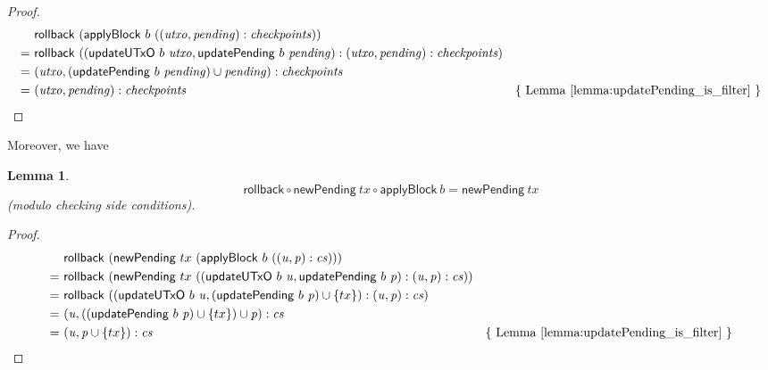 \documentclass{article}
\newtheorem{lemma}{Lemma}
\begin{document}
\begin{proof}
\begin{align*}
    & \mathsf{rollback} ~ (\mathsf{applyBlock} ~ b ~ ((\mathit{utxo}, \mathit{pending}) : \mathit{checkpoints})) \\
= ~ & \mathsf{rollback} ~ (( \mathsf{updateUTxO} ~ b ~ \mathit{utxo}
         , \mathsf{updatePending} ~ b ~ \mathit{pending}
         )
         : (\mathit{utxo}, \mathit{pending}) : \mathit{checkpoints}
         ) \\
= ~ & (\mathit{utxo}, (\mathsf{updatePending} ~ b ~ \mathit{pending}) \cup \mathit{pending}) : \mathit{checkpoints} \\
= ~ & (\mathit{utxo}, \mathit{pending}) : \mathit{checkpoints} & \text{\{ Lemma~\ref{lemma:updatePending_is_filter} \}}
\end{align*}
\end{proof}

Moreover, we have

\begin{lemma}
\begin{equation*}
\mathsf{rollback} \circ \mathsf{newPending} ~ tx \circ \mathsf{applyBlock} ~ b
= \mathsf{newPending} ~ tx
\end{equation*}
(modulo checking side conditions).
\end{lemma}

\begin{proof}
\begin{align*}
    & \mathsf{rollback} ~ (\mathsf{newPending} ~ tx ~ (\mathsf{applyBlock} ~ b ~ ((\mathit{u}, \mathit{p}) : \mathit{cs}))) \\
= ~ & \mathsf{rollback} ~ (\mathsf{newPending} ~ tx ~ (( \mathsf{updateUTxO} ~ b ~ \mathit{u}
         , \mathsf{updatePending} ~ b ~ \mathit{p}
         )
         : (\mathit{u}, \mathit{p}) : \mathit{cs}
         )) \\
= ~ & \mathsf{rollback} ~ (( \mathsf{updateUTxO} ~ b ~ \mathit{u}
         , (\mathsf{updatePending} ~ b ~ \mathit{p}) \cup \{tx\}
         )
         : (\mathit{u}, \mathit{p}) : \mathit{cs}
         ) \\
= ~ & (\mathit{u}, ((\mathsf{updatePending} ~ b ~ \mathit{p}) \cup \{tx\}) \cup \mathit{p}) : \mathit{cs} \\
= ~ & (\mathit{u}, \mathit{p} \cup \{tx\}) : \mathit{cs} & \text{\{ Lemma~\ref{lemma:updatePending_is_filter} \}}
\end{align*}
\end{proof}
\end{document}
